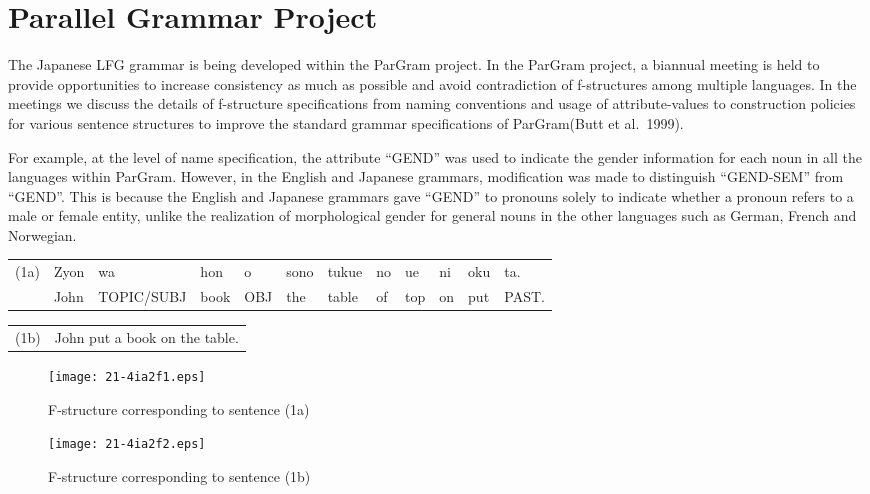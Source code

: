 \documentclass[english]{jnlp_1.4_rep}
\begin{document}
\section{Parallel Grammar Project} \label{ParGram}

The Japanese LFG grammar is being developed within the ParGram
project.  In the ParGram project, a biannual meeting is held to provide
opportunities to increase consistency as much as possible and avoid
contradiction of f-structures among multiple languages. In the
meetings we discuss the details of f-structure specifications from
naming conventions and usage of attribute-values to construction
policies for various sentence structures to improve the standard
grammar specifications of ParGram(Butt et al.\ 1999).

For example, at the level of name specification, the attribute
``GEND'' was used to indicate the gender information for each noun in
all the languages within ParGram.  However, in the English and
Japanese grammars, modification was made to distinguish ``GEND-SEM''
from ``GEND''. This is because the English and Japanese grammars gave
``GEND'' to pronouns solely to indicate whether a pronoun refers to a
male or female entity, unlike the realization of morphological gender
for general nouns in the other languages such as German, French and
Norwegian.

\vspace{2pt}
\noindent
\begin{tabular}{ll@{ }l@{ }l@{ }l@{ }l@{ }l@{ }l@{ }l@{ }l@{ }l@{ }l}
(1a) & Zyon&wa&hon&o&sono&tukue&no&ue&ni&oku&ta.\\ 
     & John&TOPIC/SUBJ&book&OBJ&the&table&of&top&on&put&PAST.
\end{tabular}

\noindent
\begin{tabular}{ll}
(1b) & John put a book on the table.
\end{tabular}
\vspace{4pt}

\begin{figure}[t]
\begin{center}
\texttt{[image: 21-4ia2f1.eps]}
\end{center}
\caption{F-structure corresponding to sentence (1a)}
\label{fig2-1jp}
\end{figure}
\begin{figure}[t]
\begin{center}
\texttt{[image: 21-4ia2f2.eps]}
\end{center}
\caption{F-structure corresponding to sentence (1b)}
\label{fig2-1eng}
\end{figure}
\end{document}
